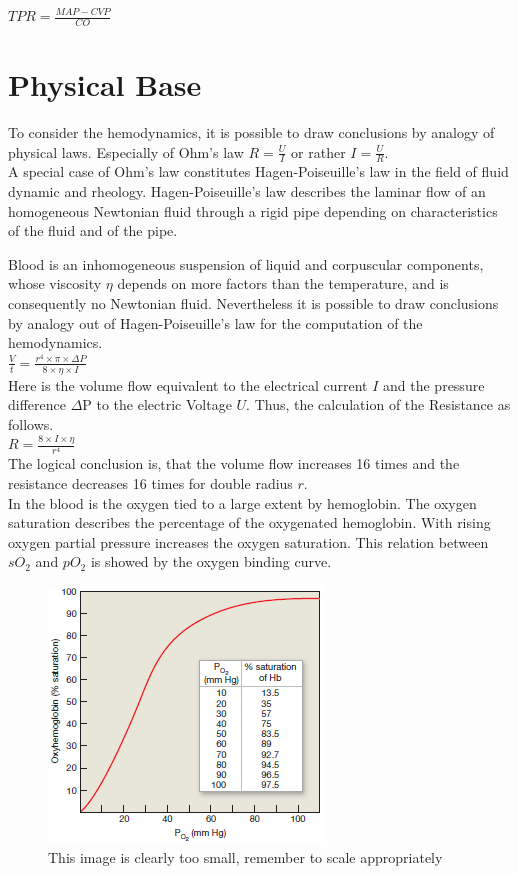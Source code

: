 $ TPR=\frac{MAP-CVP}{CO} $

\section{Physical Base}
To consider the hemodynamics, it is possible to draw conclusions by analogy of physical laws. Especially of Ohm's law $ R=\frac{U}{I} $ or rather $ I=\frac{U}{R} $.\\

A special case of Ohm's law constitutes Hagen-Poiseuille's law in the field of fluid dynamic and rheology. Hagen-Poiseuille's law describes the laminar flow of an homogeneous Newtonian fluid through a rigid pipe depending on characteristics of the fluid and of the pipe.

Blood is an inhomogeneous suspension of liquid and corpuscular components, whose viscosity $ \eta $ depends on more factors than the temperature, and is consequently no Newtonian fluid. Nevertheless it is possible to draw conclusions by analogy out of Hagen-Poiseuille's law for the computation of the hemodynamics.\\

$ \frac{V}{t}=\frac{r^{4}\times\pi\times\Delta P}{8\times\eta\times I} $\\

Here is the volume flow equivalent to the electrical current $ I $ and the pressure difference $ \Delta $P to the electric Voltage $ U $. Thus, the calculation of the Resistance as follows.\\

$ R=\frac{8\times I\times\eta}{r^{4}} $\\

The logical conclusion is, that the volume flow increases 16 times and the resistance decreases 16 times for double radius $ r $.\\

In the blood is the oxygen tied to a large extent by hemoglobin. The oxygen saturation describes the percentage of the oxygenated hemoglobin. With rising oxygen partial pressure increases the oxygen saturation. This relation between $ sO_{2} $ and $ pO_{2} $ is showed by the oxygen binding curve.

\begin{figure}[H]                                         %
	\includegraphics[width=.4\textwidth]{figures/oxygen_saturation_curve}  %
	\caption{This image is clearly too small, remember to scale appropriately }
	\label{fig:FigureLABEL}  %
\end{figure}

